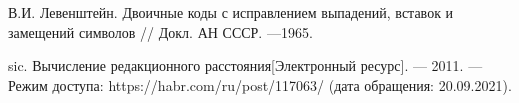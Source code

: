 \begin{thebibliography}{9}
    \label{cha:biblio}

     В.И. Левенштейн. Двоичные коды с исправлением выпадений, вставок
    и замещений символов // Докл. АН СССР. —1965.
    
     sic. Вычисление редакционного расстояния[Электронный ресурс]. —
    2011. —Режим доступа: https://habr.com/ru/post/117063/ (дата обращения: 20.09.2021).
    
\end{thebibliography}
